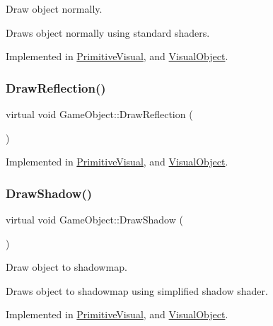 Draw object normally. 

Draws object normally using standard shaders. 

Implemented in \mbox{\hyperlink{class_primitive_visual_a9ce21acf4bb9b9d9ac24c75f6aa9aec3}{Primitive\+Visual}}, and \mbox{\hyperlink{class_visual_object_a10c0e01e375fd4af08e57f3475dd312c}{Visual\+Object}}.

\mbox{\label{class_game_object_ad28240509bb63e4fde243e842898cf30}} 
\subsubsection{\texorpdfstring{DrawReflection()}{DrawReflection()}}
{\footnotesize\ttfamily virtual void Game\+Object\+::\+Draw\+Reflection (\begin{DoxyParamCaption}{ }\end{DoxyParamCaption})\hspace{0.3cm}{\ttfamily [pure virtual]}}



Implemented in \mbox{\hyperlink{class_primitive_visual_a474e31c4bcf99e49da2ea943d6f25746}{Primitive\+Visual}}, and \mbox{\hyperlink{class_visual_object_afaf21bc843280f7f8ebf52ab7d71ac2d}{Visual\+Object}}.

\mbox{\label{class_game_object_a78bf45c8ef3805247435583556087788}} 
\subsubsection{\texorpdfstring{DrawShadow()}{DrawShadow()}}
{\footnotesize\ttfamily virtual void Game\+Object\+::\+Draw\+Shadow (\begin{DoxyParamCaption}{ }\end{DoxyParamCaption})\hspace{0.3cm}{\ttfamily [pure virtual]}}



Draw object to shadowmap. 

Draws object to shadowmap using simplified shadow shader. 

Implemented in \mbox{\hyperlink{class_primitive_visual_a67915de082572ca4f6467c1402587024}{Primitive\+Visual}}, and \mbox{\hyperlink{class_visual_object_a88e778dc97ad93cefd5193d6899d6c82}{Visual\+Object}}.

